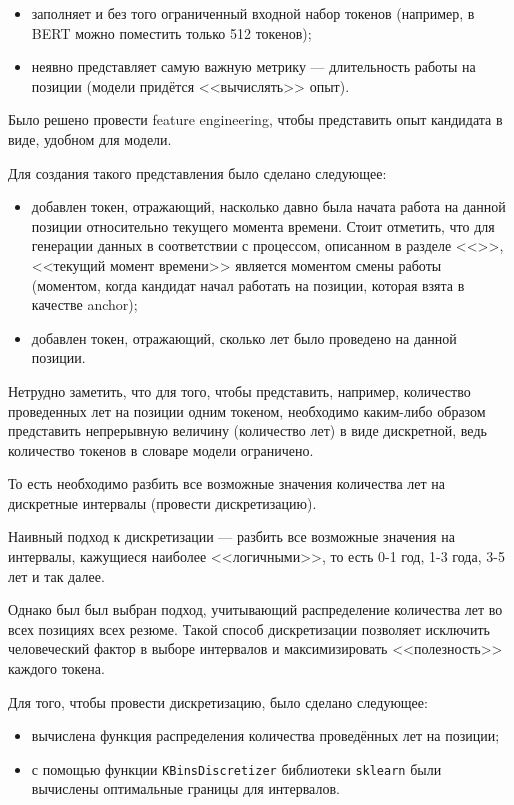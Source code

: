 \documentclass[14pt]{mmcs_article}
\begin{document}
\begin{itemize}
  \item заполняет и без того ограниченный входной набор токенов (например, в BERT можно поместить только 512 токенов);
  \item неявно представляет самую важную метрику — длительность работы на позиции (модели придётся <<вычислять>> опыт).
\end{itemize}

Было решено провести feature engineering, чтобы представить опыт кандидата в виде, удобном для модели.

Для создания такого представления было сделано следующее:

\begin{itemize}
  \item добавлен токен, отражающий, насколько давно была начата работа на данной позиции относительно текущего момента времени. Стоит отметить, что для генерации данных в соответствии с процессом, описанном в разделе <<>>, <<текущий момент времени>> является моментом смены работы (моментом, когда кандидат начал работать на позиции, которая взята в качестве anchor);
  \item добавлен токен, отражающий, сколько лет было проведено на данной позиции.
\end{itemize}

Нетрудно заметить, что для того, чтобы представить, например, количество проведенных лет на позиции одним токеном, необходимо каким-либо образом представить непрерывную величину (количество лет) в виде дискретной, ведь количество токенов в словаре модели ограничено.

То есть необходимо разбить все возможные значения количества лет на дискретные интервалы (провести дискретизацию).

Наивный подход к дискретизации --- разбить все возможные значения на интервалы, кажущиеся наиболее <<логичными>>, то есть 0-1 год, 1-3 года, 3-5 лет и так далее.

Однако был был выбран подход, учитывающий распределение количества лет во всех позициях всех резюме. Такой способ дискретизации позволяет исключить человеческий фактор в выборе интервалов и максимизировать <<полезность>> каждого токена.

Для того, чтобы провести дискретизацию, было сделано следующее:

\begin{itemize}
  \item вычислена функция распределения количества проведённых лет на позиции;
  \item с помощью функции \texttt{KBinsDiscretizer} библиотеки \texttt{sklearn} \cite{pedregosa2018scikitlearnmachinelearningpython} были вычислены оптимальные границы для интервалов.
\end{itemize}
\end{document}
